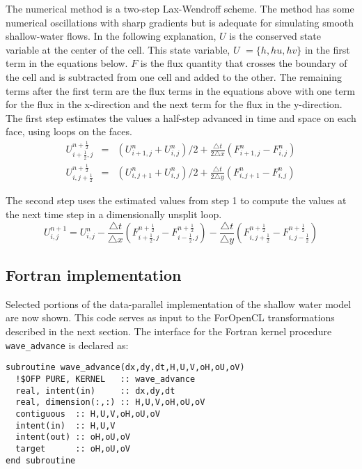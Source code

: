 The numerical method is a two-step Lax-Wendroff scheme. The method
has some numerical oscillations with sharp gradients but is adequate
for simulating smooth shallow-water flows. In the following explanation,
$U$ is the conserved state variable at the center of the cell. This
state variable, $U$ $=\{h,hu,hv\}$ in the first term in the equations
below. $F$ is the flux quantity that crosses the boundary of the cell
and is subtracted from one cell and added to the other. The remaining
terms after the first term are the flux terms in the equations above
with one term for the flux in the x-direction and the next term for
the flux in the y-direction. The first step estimates the values a
half-step advanced in time and space on each face, using loops on
the faces.\begin{eqnarray*}
U_{i+\frac{1}{2},j}^{n+\frac{1}{2}} & = & (U_{i+1,j}^{n}+U_{i,j}^{n})/2+\frac{\triangle t}{2\triangle x}\left(F_{i+1,j}^{n}-F_{i,j}^{n}\right)\\
U_{i,j+\frac{1}{2}}^{n+\frac{1}{2}} & = & (U_{i,j+1}^{n}+U_{i,j}^{n})/2+\frac{\triangle t}{2\triangle y}\left(F_{i,j+1}^{n}-F_{i,j}^{n}\right)\end{eqnarray*}


The second step uses the estimated values from step 1 to compute the
values at the next time step in a dimensionally unsplit loop.\[
U_{i,j}^{n+1}=U_{i,j}^{n}-\frac{\triangle t}{\triangle x}(F_{i+\frac{1}{2},j}^{n+\frac{1}{2}}-F_{i-\frac{1}{2},j}^{n+\frac{1}{2}})-\frac{\triangle t}{\triangle y}(F_{i,j+\frac{1}{2}}^{n+\frac{1}{2}}-F_{i,j-\frac{1}{2}}^{n+\frac{1}{2}})\]


\subsection{Fortran implementation}

Selected portions of the data-parallel implementation of the shallow water model
are now shown.  This code serves as input to the ForOpenCL transformations
described in the next section.  The interface for the Fortran kernel procedure {\tt
  wave\_advance} is declared as:

{\small
\begin{verbatim}
subroutine wave_advance(dx,dy,dt,H,U,V,oH,oU,oV)
  !$OFP PURE, KERNEL   :: wave_advance
  real, intent(in)     :: dx,dy,dt
  real, dimension(:,:) :: H,U,V,oH,oU,oV
  contiguous  :: H,U,V,oH,oU,oV
  intent(in)  :: H,U,V
  intent(out) :: oH,oU,oV
  target      :: oH,oU,oV
end subroutine
\end{verbatim}
}

